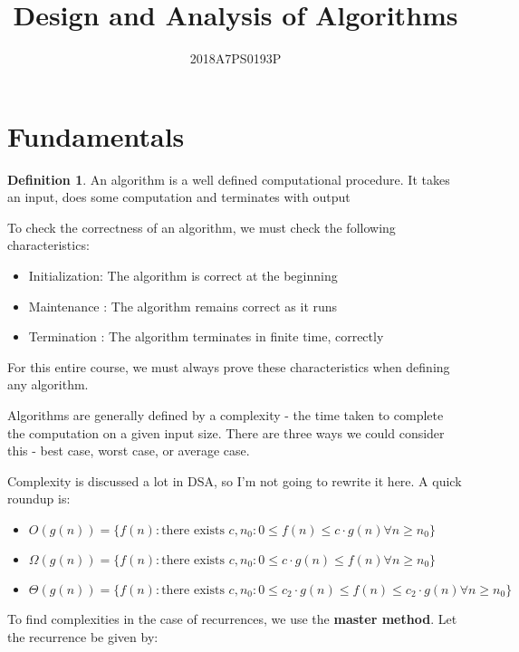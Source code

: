 \documentclass[12pt,letterpaper]{article}
\title{Design and Analysis of Algorithms}
\author{2018A7PS0193P}
\theoremstyle{definition}
\newtheorem{definition}{Definition}[section] %
\begin{document}
\maketitle

\section{Fundamentals}

\begin{definition}
  An algorithm is a well defined computational procedure. It takes an input, does some computation and terminates with output
\end{definition}

To check the correctness of an algorithm, we must check the following characteristics:

\begin{itemize}
  \item Initialization: The algorithm is correct at the beginning
  \item Maintenance : The algorithm remains correct as it runs
  \item Termination : The algorithm terminates in finite time, correctly
\end{itemize}

For this entire course, we must always prove these characteristics when defining any algorithm.

Algorithms are generally defined by a complexity - the time taken to complete the computation on a given input size. There are three ways we could consider this - best case, worst case, or average case.

Complexity is discussed a lot in DSA, so I'm not going to rewrite it here. A quick roundup is:

\begin{itemize}
  \item $O(g(n)) = \{f(n) : \text{there exists } c, n_0 : 0 \leq f(n) \leq c \cdot g(n) \forall n \geq n_0 \}$
  \item $\Omega(g(n)) = \{f(n) : \text{there exists } c, n_0 : 0 \leq c \cdot g(n)\leq f(n) \forall n \geq n_0 \}$
  \item $\Theta(g(n)) = \{f(n) : \text{there exists } c, n_0 : 0 \leq c_2 \cdot g(n)\leq f(n) \leq c_2 \cdot g(n) \forall n \geq n_0 \}$
\end{itemize}

To find complexities in the case of recurrences, we use the \textbf{master method}. Let the recurrence be given by:
\end{document}
